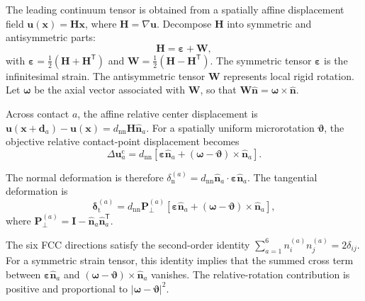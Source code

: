 The leading continuum tensor is obtained from a spatially affine displacement field $\mathbf{u}(\mathbf{x}) = \mathbf{H}\mathbf{x}$, where $\mathbf{H}=\nabla\mathbf{u}$. Decompose $\mathbf{H}$ into symmetric and antisymmetric parts:
\begin{equation}
    \mathbf{H} = \boldsymbol{\varepsilon}+\mathbf{W},
\end{equation}
with $\boldsymbol{\varepsilon} = \frac{1}{2}(\mathbf{H}+\mathbf{H}^{\mathsf{T}})$ and $\mathbf{W} = \frac{1}{2}(\mathbf{H}-\mathbf{H}^{\mathsf{T}})$. The symmetric tensor $\boldsymbol{\varepsilon}$ is the infinitesimal strain. The antisymmetric tensor $\mathbf{W}$ represents local rigid rotation. Let $\boldsymbol{\omega}$ be the axial vector associated with $\mathbf{W}$, so that $\mathbf{W}\hat{\mathbf{n}} = \boldsymbol{\omega}\times\hat{\mathbf{n}}$.

Across contact $a$, the affine relative center displacement is $\mathbf{u}(\mathbf{x}+\mathbf{d}_a)-\mathbf{u}(\mathbf{x}) = d_{\mathrm{nn}} \mathbf{H}\hat{\mathbf{n}}_a$. For a spatially uniform microrotation $\boldsymbol{\vartheta}$, the objective relative contact-point displacement becomes
\begin{equation}
    \Delta\mathbf{u}_a^{\mathrm{c}} = d_{\mathrm{nn}} \left[ \boldsymbol{\varepsilon}\hat{\mathbf{n}}_a + (\boldsymbol{\omega}-\boldsymbol{\vartheta}) \times \hat{\mathbf{n}}_a \right].
\end{equation}

The normal deformation is therefore $\delta_{\mathrm{n}}^{(a)} = d_{\mathrm{nn}} \hat{\mathbf{n}}_a \cdot \boldsymbol{\varepsilon} \hat{\mathbf{n}}_a$. The tangential deformation is
\begin{equation}
    \boldsymbol{\delta}_{\mathrm{t}}^{(a)} = d_{\mathrm{nn}} \mathbf{P}_\perp^{(a)} \left[ \boldsymbol{\varepsilon}\hat{\mathbf{n}}_a + (\boldsymbol{\omega}-\boldsymbol{\vartheta}) \times \hat{\mathbf{n}}_a \right],
\end{equation}
where $\mathbf{P}_\perp^{(a)} = \mathbf{I}-\hat{\mathbf{n}}_a\hat{\mathbf{n}}_a^{\mathsf{T}}$.

The six FCC directions satisfy the second-order identity $\sum_{a=1}^{6} n_i^{(a)}n_j^{(a)} = 2\delta_{ij}$. For a symmetric strain tensor, this identity implies that the summed cross term between $\boldsymbol{\varepsilon}\hat{\mathbf{n}}_a$ and $(\boldsymbol{\omega}-\boldsymbol{\vartheta})\times\hat{\mathbf{n}}_a$ vanishes. The relative-rotation contribution is positive and proportional to $|\boldsymbol{\omega}-\boldsymbol{\vartheta}|^2$.

